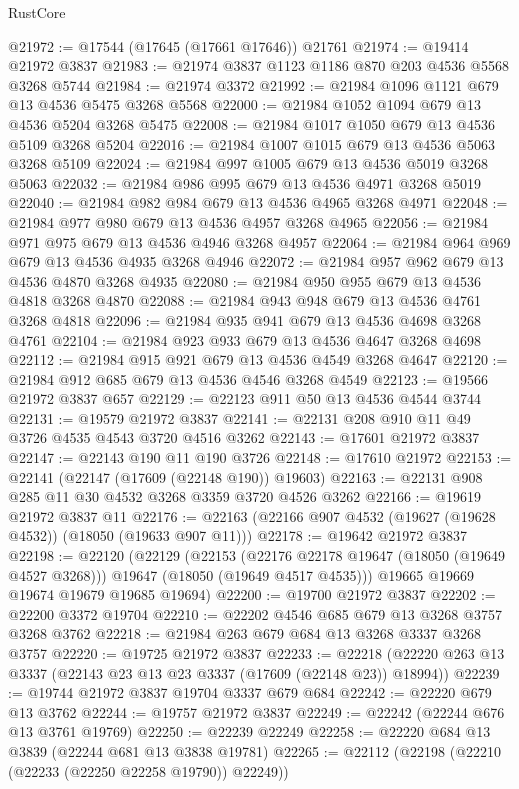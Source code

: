 \begin{lexlean}{RustCore}
\begin{coremodule}
@21972 := @17544 (@17645 (@17661 @17646)) @21761
@21974 := @19414 @21972 @3837
@21983 := @21974 @3837 @1123 @1186 @870 @203 @4536 @5568 @3268 @5744
@21984 := @21974 @3372
@21992 := @21984 @1096 @1121 @679 @13 @4536 @5475 @3268 @5568
@22000 := @21984 @1052 @1094 @679 @13 @4536 @5204 @3268 @5475
@22008 := @21984 @1017 @1050 @679 @13 @4536 @5109 @3268 @5204
@22016 := @21984 @1007 @1015 @679 @13 @4536 @5063 @3268 @5109
@22024 := @21984 @997 @1005 @679 @13 @4536 @5019 @3268 @5063
@22032 := @21984 @986 @995 @679 @13 @4536 @4971 @3268 @5019
@22040 := @21984 @982 @984 @679 @13 @4536 @4965 @3268 @4971
@22048 := @21984 @977 @980 @679 @13 @4536 @4957 @3268 @4965
@22056 := @21984 @971 @975 @679 @13 @4536 @4946 @3268 @4957
@22064 := @21984 @964 @969 @679 @13 @4536 @4935 @3268 @4946
@22072 := @21984 @957 @962 @679 @13 @4536 @4870 @3268 @4935
@22080 := @21984 @950 @955 @679 @13 @4536 @4818 @3268 @4870
@22088 := @21984 @943 @948 @679 @13 @4536 @4761 @3268 @4818
@22096 := @21984 @935 @941 @679 @13 @4536 @4698 @3268 @4761
@22104 := @21984 @923 @933 @679 @13 @4536 @4647 @3268 @4698
@22112 := @21984 @915 @921 @679 @13 @4536 @4549 @3268 @4647
@22120 := @21984 @912 @685 @679 @13 @4536 @4546 @3268 @4549
@22123 := @19566 @21972 @3837 @657
@22129 := @22123 @911 @50 @13 @4536 @4544 @3744
@22131 := @19579 @21972 @3837
@22141 := @22131 @208 @910 @11 @49 @3726 @4535 @4543 @3720 @4516 @3262
@22143 := @17601 @21972 @3837
@22147 := @22143 @190 @11 @190 @3726
@22148 := @17610 @21972
@22153 := @22141 (@22147 (@17609 (@22148 @190)) @19603)
@22163 := @22131 @908 @285 @11 @30 @4532 @3268 @3359 @3720 @4526 @3262
@22166 := @19619 @21972 @3837 @11
@22176 := @22163 (@22166 @907 @4532 (@19627 (@19628 @4532)) (@18050 (@19633 @907 @11)))
@22178 := @19642 @21972 @3837
@22198 := @22120
    (@22129
      (@22153
        (@22176 @22178 @19647 (@18050 (@19649 @4527 @3268)))
        @19647
        (@18050 (@19649 @4517 @4535)))
      @19665
      @19669
      @19674
      @19679
      @19685
      @19694)
@22200 := @19700 @21972 @3837
@22202 := @22200 @3372 @19704
@22210 := @22202 @4546 @685 @679 @13 @3268 @3757 @3268 @3762
@22218 := @21984 @263 @679 @684 @13 @3268 @3337 @3268 @3757
@22220 := @19725 @21972 @3837
@22233 := @22218 (@22220 @263 @13 @3337 (@22143 @23 @13 @23 @3337 (@17609 (@22148 @23)) @18994))
@22239 := @19744 @21972 @3837 @19704 @3337 @679 @684
@22242 := @22220 @679 @13 @3762
@22244 := @19757 @21972 @3837
@22249 := @22242 (@22244 @676 @13 @3761 @19769)
@22250 := @22239 @22249
@22258 := @22220 @684 @13 @3839 (@22244 @681 @13 @3838 @19781)
@22265 := @22112 (@22198 (@22210 (@22233 (@22250 @22258 @19790)) @22249))

\end{coremodule}
\end{lexlean}
